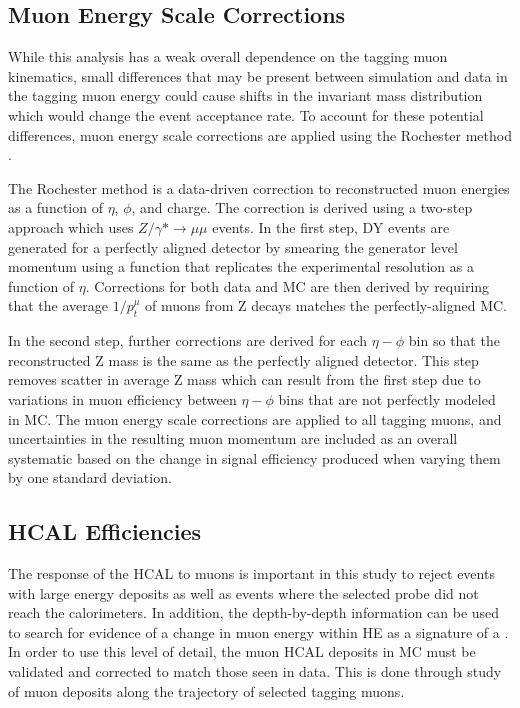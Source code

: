 \subsection{Muon Energy Scale Corrections}
While this analysis has a weak overall dependence on the tagging muon kinematics, small differences that may be present between simulation and data in the tagging muon energy could cause shifts in the invariant mass distribution which would change the event acceptance rate.
To account for these potential differences, muon energy scale corrections are applied using the Rochester method \cite{rochester_corr}.

The Rochester method is a data-driven correction to reconstructed muon energies as a function of $\eta$, $\phi$, and charge.
The correction is derived using a two-step approach which uses $Z/\gamma* \rightarrow \mu\mu$ events.
In the first step, DY events are generated for a perfectly aligned detector by smearing the generator level momentum using a function that replicates the experimental resolution as a function of $\eta$. 
Corrections for both data and MC are then derived by requiring that the average $1/p_t^\mu$ of muons from Z decays matches the perfectly-aligned MC.

In the second step, further corrections are derived for each $\eta-\phi$ bin so that the reconstructed Z mass is the same as the perfectly aligned detector. 
This step removes scatter in average Z mass which can result from the first step due to variations in muon efficiency between $\eta-\phi$ bins that are not perfectly modeled in MC. 
The muon energy scale corrections are applied to all tagging muons, and uncertainties in the resulting muon momentum are included as an overall systematic based on the change in signal efficiency produced when varying them by one standard deviation.

\subsection{HCAL Efficiencies}
\label{sec:HCALeff}
The response of the HCAL to muons is important in this study to reject events with large energy deposits as well as events where the selected probe did not reach the calorimeters.
In addition, the depth-by-depth information can be used to search for evidence of a change in muon energy within HE as a signature of a \dbrem.
In order to use this level of detail, the muon HCAL deposits in MC must be validated and corrected to match those seen in data.
This is done through study of muon deposits along the trajectory of selected tagging muons.


